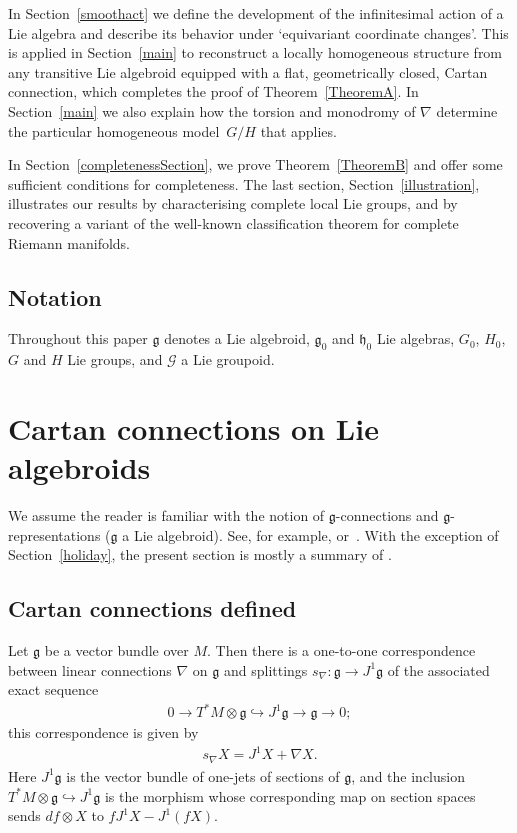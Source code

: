 \documentclass[pdftex]{sigma}
\newcommand\monomorphism{\hookrightarrow}
\numberwithin{equation}{section}
\begin{document}
In Section~\ref{smoothact} we def\/ine the development of the inf\/initesimal
action of a Lie algebra and describe its behavior under `equivariant
coordinate changes'. This is applied in Section~\ref{main} to reconstruct
a locally homogeneous structure from any transitive Lie algebroid
equipped with a f\/lat, geometrically closed, Cartan connection, which
completes the proof of Theorem~\ref{TheoremA}. In Section~\ref{main} we also explain how the
torsion and monodromy of $\nabla$ determine the particular homogeneous
model~$G/H$ that applies.

In Section~\ref{completenessSection}, we prove Theorem~\ref{TheoremB} and of\/fer some
suf\/f\/icient conditions for completeness. The last section,
Section~\ref{illustration}, illustrates our results by characterising
complete local Lie groups, and by recovering a variant of the
well-known classif\/ication theorem for complete Riemann manifolds.

\subsection{Notation}

Throughout this paper ${\mathfrak g} $ denotes a
Lie algebroid, ${\mathfrak g}_0 $ and ${\mathfrak h}_0$ Lie algebras,
$G_0$, $H_0$, $G$ and $H$ Lie groups, and ${\mathcal G}$ a Lie
groupoid.


\section{Cartan connections on Lie algebroids}\label{section1}

We assume the reader is familiar with the notion of $\mathfrak
g$-connections and $\mathfrak g$-representations ($\mathfrak g$ a Lie
algebroid).
See, for example, \cite{Blaom_05} or~\cite{Blaom_12}.  With the
exception of Section~\ref{holiday}, the present section is mostly a summary
of \cite{Blaom_05}.

\subsection{Cartan connections def\/ined}\label{skoj}

Let ${\mathfrak g} $ be a vector bundle over $M$. Then there is a
one-to-one correspondence between linear connections $\nabla$ on
${\mathfrak g}$ and splittings $s_\nabla \colon {\mathfrak g}
\rightarrow J^1{\mathfrak g} $ of the associated exact sequence
\begin{gather*}
                 0\rightarrow T^*\!M\otimes{\mathfrak g}\monomorphism J^1{\mathfrak
                 g}\rightarrow{\mathfrak g}\rightarrow 0;
\end{gather*}
this correspondence is given by
\begin{gather*}
  s_\nabla X=J^1X + \nabla X.%
\end{gather*}
Here $J^1 {\mathfrak g} $ is the vector bundle of one-jets of sections
of $\mathfrak g$, and the inclusion $T^*\!M\otimes{\mathfrak
  g}\monomorphism J^1{\mathfrak g}$ is the morphism whose
corresponding map on section spaces sends $df \otimes X$ to $ f J^1 X
- J^1 (fX)$.
\end{document}
